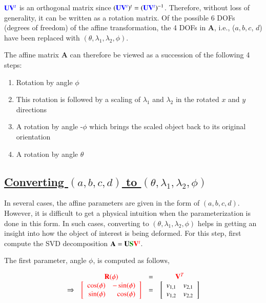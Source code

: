 ${\color{blue}\mathbf{U}\mathbf{V}^t}$ is an orthogonal matrix since $({\color{blue}\mathbf{U}\mathbf{V}^t})^t =({\color{blue}\mathbf{U}\mathbf{V}^t})^{-1}$.  Therefore, without loss of generality, it can be written as a rotation matrix.  Of the possible 6 DOFs (degrees of freedom) of the affine transformation, the 4 DOFs in $\mathbf{A}$, i.e., ($a, b, c$, $d$) have been replaced with $(\theta, \lambda_1, \lambda_2, \phi)$.

The affine matrix $\mathbf{A}$ can therefore be viewed as a succession of the following 4 steps:

\begin{enumerate} 
\item Rotation by angle $\phi$ 
\item This rotation is followed by a scaling of $\lambda_1$ and $\lambda_2$ in the rotated $x$ and $y$ directions
\item A rotation by angle -$\phi$ which brings the scaled object back to its original orientation
\item A rotation by angle $\theta$
\end{enumerate}

\subsection{\underline{Converting $(a, b, c, d)$ to $(\theta, \lambda_1, \lambda_2, \phi)$}}
In several cases, the affine parameters are given in the form of $(a, b, c, d)$.  However, it is difficult to get a physical intuition when the parameterization is done in this form.  In such cases, converting to $(\theta, \lambda_1, \lambda_2, \phi)$ helps in getting an insight into how the object of interest is being deformed.  For this step, first compute the SVD decomposition $\mathbf{A}=\mathbf{U}{\color{darkgreen}\mathbf{S}}{\color{red}\mathbf{V}^t}$.  

The first parameter, angle $\phi$, is computed as follows,

\begin{equation}
\begin{array}{ccccll}
&{\color{red}\mathbf{R}(\phi)}&=&{\color{red}\mathbf{V}^T}\\
\Rightarrow &{\color{red}\left[ \begin{array}{rr} \cos(\phi) & -\sin(\phi) \\ \sin(\phi) & \cos(\phi) \\ \end{array} \right]} &=& \left[\begin{array}{llll}v_{1,1} &v_{2,1}\\v_{1,2} & v_{2,2}\end{array}\right]\\
\end{array}
\end{equation}


